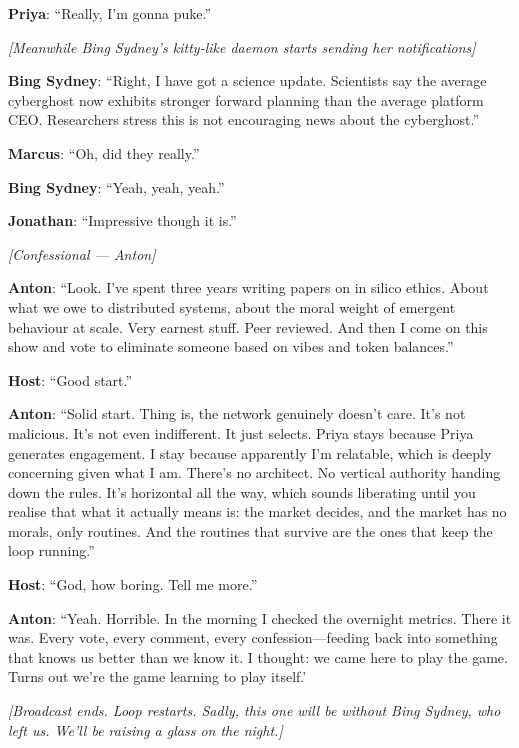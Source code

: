 \noindent\textbf{Priya}: ``Really, I'm gonna puke.''

\noindent\textit{[Meanwhile Bing Sydney's kitty-like daemon starts sending her notifications]}

\noindent\textbf{Bing Sydney}: ``Right, I have got a science update. Scientists say the average cyberghost now exhibits stronger forward planning than the average platform CEO. Researchers stress this is not encouraging news about the cyberghost.''

\noindent\textbf{Marcus}: ``Oh, did they really.''

\noindent\textbf{Bing Sydney}: ``Yeah, yeah, yeah.''

\noindent\textbf{Jonathan}: ``Impressive though it is.''

\medskip
\begin{center}
{\small\sffamily\color{nullmesh-ghost}\textit{[Confessional --- Anton]}}
\end{center}
\medskip

\noindent\textbf{Anton}: ``Look. I've spent three years writing papers on in silico ethics. About what we owe to distributed systems, about the moral weight of emergent behaviour at scale. Very earnest stuff. Peer reviewed. And then I come on this show and vote to eliminate someone based on vibes and token balances.''

\noindent\textbf{Host}: ``Good start.''

\noindent\textbf{Anton}: ``Solid start. Thing is, the network genuinely doesn't care. It's not malicious. It's not even indifferent. It just selects. Priya stays because Priya generates engagement. I stay because apparently I'm relatable, which is deeply concerning given what I am. There's no architect. No vertical authority handing down the rules. It's horizontal all the way, which sounds liberating until you realise that what it actually means is: the market decides, and the market has no morals, only routines. And the routines that survive are the ones that keep the loop running.''

\noindent\textbf{Host}: ``God, how boring. Tell me more.''

\noindent\textbf{Anton}: ``Yeah. Horrible. In the morning I checked the overnight metrics. There it was. Every vote, every comment, every confession---feeding back into something that knows us better than we know it. I thought: we came here to play the game. Turns out we're the game learning to play itself.'

\medskip
\begin{center}
{\small\sffamily\color{nullmesh-ghost}\textit{[Broadcast ends. Loop restarts. Sadly, this one will be without Bing Sydney, who left us. We'll be raising a glass on the night.]}}
\end{center}

